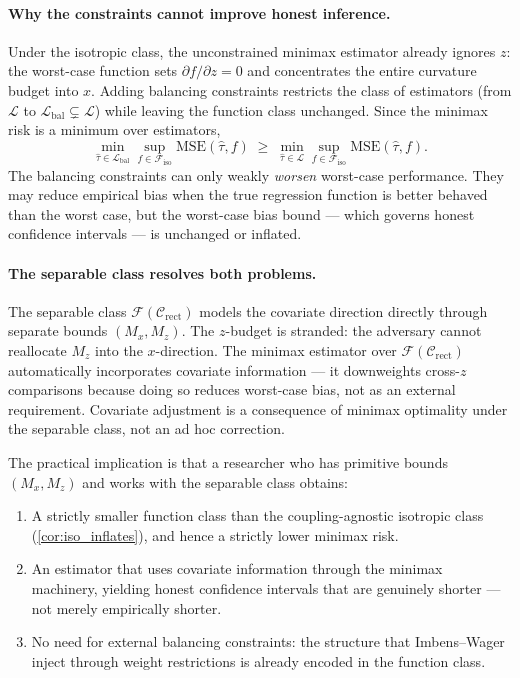 \paragraph{Why the constraints cannot improve honest inference.}
Under the isotropic class, the unconstrained minimax estimator already ignores $z$: the worst-case function sets $\partial f / \partial z = 0$ and concentrates the entire curvature budget into $x$.
Adding balancing constraints restricts the class of estimators (from $\mathcal{L}$ to $\mathcal{L}_{\mathrm{bal}} \subsetneq \mathcal{L}$) while leaving the function class unchanged.
Since the minimax risk is a minimum over estimators,
\begin{equation*}
	\min_{\hat\tau \in \mathcal{L}_{\mathrm{bal}}} \sup_{f \in \mathcal{F}_{\mathrm{iso}}} \mathrm{MSE}(\hat\tau, f) \;\geq\; \min_{\hat\tau \in \mathcal{L}} \sup_{f \in \mathcal{F}_{\mathrm{iso}}} \mathrm{MSE}(\hat\tau, f).
\end{equation*}
The balancing constraints can only weakly \emph{worsen} worst-case performance.
They may reduce empirical bias when the true regression function is better behaved than the worst case, but the worst-case bias bound --- which governs honest confidence intervals --- is unchanged or inflated.

\paragraph{The separable class resolves both problems.}
The separable class $\mathcal{F}(\mathcal{C}_{\mathrm{rect}})$ models the covariate direction directly through separate bounds $(M_x, M_z)$.
The $z$-budget is stranded: the adversary cannot reallocate $M_z$ into the $x$-direction.
The minimax estimator over $\mathcal{F}(\mathcal{C}_{\mathrm{rect}})$ automatically incorporates covariate information --- it downweights cross-$z$ comparisons because doing so reduces worst-case bias, not as an external requirement.
Covariate adjustment is a consequence of minimax optimality under the separable class, not an ad hoc correction.

The practical implication is that a researcher who has primitive bounds $(M_x, M_z)$ and works with the separable class obtains:
\begin{enumerate}
	\item A strictly smaller function class than the coupling-agnostic isotropic class (\cref{cor:iso_inflates}), and hence a strictly lower minimax risk.
	\item An estimator that uses covariate information through the minimax machinery, yielding honest confidence intervals that are genuinely shorter --- not merely empirically shorter.
	\item No need for external balancing constraints: the structure that Imbens--Wager inject through weight restrictions is already encoded in the function class.
\end{enumerate}